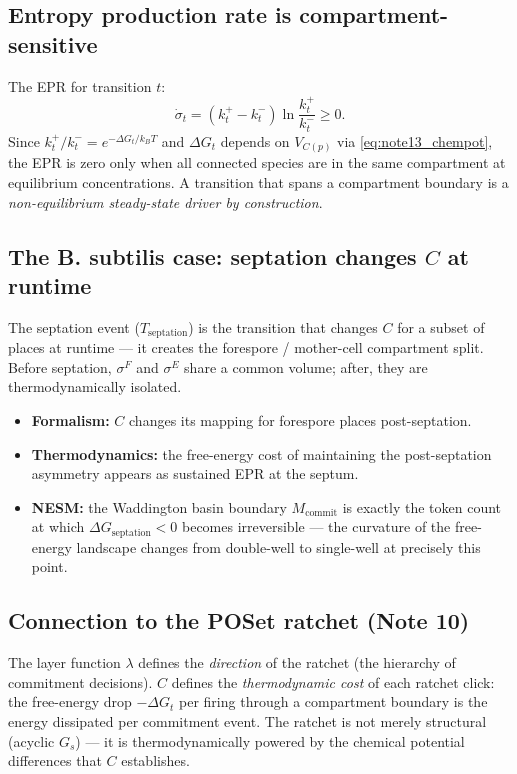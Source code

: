 \documentclass[11pt,a4paper]{article}
\begin{document}
\subsection*{Entropy production rate is compartment-sensitive}

The EPR for transition $t$:
\begin{equation}
  \dot\sigma_t = (k_t^+ - k_t^-)\ln\frac{k_t^+}{k_t^-} \geq 0.
\end{equation}
Since $k_t^+/k_t^- = e^{-\Delta G_t / k_BT}$ and $\Delta G_t$ depends on
$V_{C(p)}$ via \cref{eq:note13_chempot}, the EPR is zero only when all
connected species are in the same compartment at equilibrium concentrations.
A transition that spans a compartment boundary is a \emph{non-equilibrium
steady-state driver by construction}.

\subsection*{The B. subtilis case: septation changes $C$ at runtime}

The septation event ($T_{\text{septation}}$) is the transition that changes
$C$ for a subset of places at runtime --- it creates the forespore / mother-cell
compartment split.  Before septation, $\sigma^F$ and $\sigma^E$ share a common
volume; after, they are thermodynamically isolated.
\begin{itemize}
  \item \textbf{Formalism:} $C$ changes its mapping for forespore places
    post-septation.
  \item \textbf{Thermodynamics:} the free-energy cost of maintaining the
    post-septation asymmetry appears as sustained EPR at the septum.
  \item \textbf{NESM:} the Waddington basin boundary $M_{\text{commit}}$ is
    exactly the token count at which $\Delta G_{\text{septation}} < 0$ becomes
    irreversible --- the curvature of the free-energy landscape changes from
    double-well to single-well at precisely this point.
\end{itemize}

\subsection*{Connection to the POSet ratchet (Note 10)}

The layer function $\lambda$ defines the \emph{direction} of the ratchet
(the hierarchy of commitment decisions).  $C$ defines the \emph{thermodynamic
cost} of each ratchet click: the free-energy drop $-\Delta G_t$ per firing
through a compartment boundary is the energy dissipated per commitment event.
The ratchet is not merely structural (acyclic $G_s$) --- it is thermodynamically
powered by the chemical potential differences that $C$ establishes.
\end{document}
